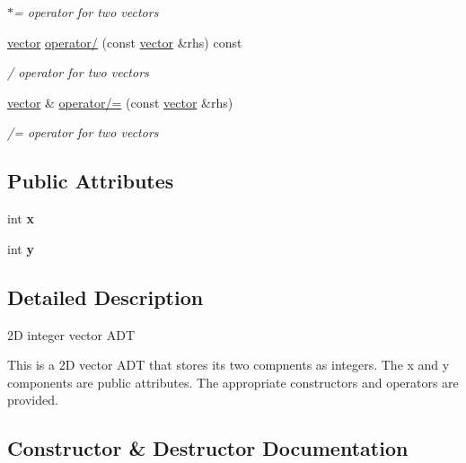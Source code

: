 \begin{DoxyCompactItemize}
\begin{DoxyCompactList}\small\item\em $\ast$= operator for two vectors \end{DoxyCompactList}\item 
\hyperlink{classvector}{vector} \hyperlink{classvector_af30f2db8e242b76c98e17bc93958aaf8}{operator/} (const \hyperlink{classvector}{vector} \&rhs) const 
\begin{DoxyCompactList}\small\item\em / operator for two vectors \end{DoxyCompactList}\item 
\hyperlink{classvector}{vector} \& \hyperlink{classvector_a0f08508b116517889088c06c86f51a2b}{operator/=} (const \hyperlink{classvector}{vector} \&rhs)
\begin{DoxyCompactList}\small\item\em /= operator for two vectors \end{DoxyCompactList}\end{DoxyCompactItemize}
\subsection*{Public Attributes}
\begin{DoxyCompactItemize}
\item 
int {\bfseries x}\hypertarget{classvector_a0403eb3aea23a3009e276fba1d317046}{}\label{classvector_a0403eb3aea23a3009e276fba1d317046}

\item 
int {\bfseries y}\hypertarget{classvector_aad6de640298eae97ca0a094db5aff477}{}\label{classvector_aad6de640298eae97ca0a094db5aff477}

\end{DoxyCompactItemize}


\subsection{Detailed Description}
2D integer vector A\+DT 

This is a 2D vector A\+DT that stores its two compnents as integers. The x and y components are public attributes. The appropriate constructors and operators are provided. 

\subsection{Constructor \& Destructor Documentation}
